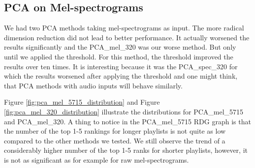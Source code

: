 \subsection{PCA on Mel-spectrograms}\label{ssec:pca_mel_results}

We had two PCA methods taking mel-spectrograms as input. The more radical dimension reduction did not lead to better performance. It actually worsened the results significantly and the PCA\_mel\_320 was our worse method. But only until we applied the threshold. For this method, the threshold improved the results over ten times. It is interesting because it was the PCA\_spec\_320 for which the results worsened after applying the threshold and one might think, that PCA methods with audio inputs will behave similarly.

Figure \ref{fig:pca_mel_5715_distribution} and Figure \ref{fig:pca_mel_320_distribution} illustrate the distributions for PCA\_mel\_5715 and PCA\_mel\_320. A thing to notice in the PCA\_mel\_{5715} RDG graph is that the number of the top 1-5 rankings for longer playlists is not quite as low compared to the other methods we tested. We still observe the trend of a considerably higher number of the top 1-5 ranks for shorter playlists, however, it is not as significant as for example for raw mel-spectrograms.
